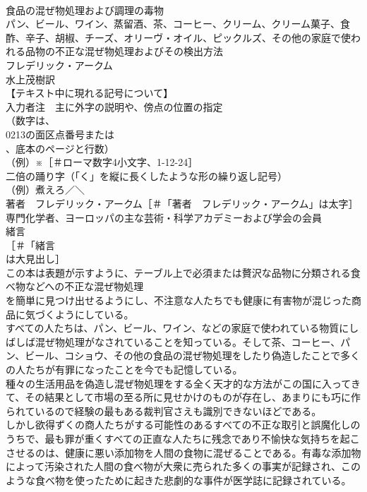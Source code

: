 \documentclass[8pt]{extreport}
\begin{document}
\begin{CJK}{UTF8}{min}
\\	食品の混ぜ物処理および調理の毒物
\\	パン、ビール、ワイン、蒸留酒、茶、コーヒー、クリーム、クリーム菓子、食酢、辛子、胡椒、チーズ、オリーヴ・オイル、ピックルズ、その他の家庭で使われる品物の不正な混ぜ物処理およびその検出方法
\\	フレデリック・アークム　
\\	水上茂樹訳
\\	【テキスト中に現れる記号について】
\\	入力者注　主に外字の説明や、傍点の位置の指定
\\	（数字は、
\\	0213の面区点番号または
\\	、底本のページと行数）
\\	（例）※［＃ローマ数字4小文字、1-12-24］
\\	二倍の踊り字（「く」を縦に長くしたような形の繰り返し記号）
\\	（例）煮えろ／＼
\\	著者　フレデリック・アークム［＃「著者　フレデリック・アークム」は太字］
\\	専門化学者、ヨーロッパの主な芸術・科学アカデミーおよび学会の会員
\\	緒言
\\	［＃「緒言
\\	は大見出し］
\\	この本は表題が示すように、テーブル上で必須または贅沢な品物に分類される食べ物などへの不正な混ぜ物処理
\\	を簡単に見つけ出せるようにし、不注意な人たちでも健康に有害物が混じった商品に気づくようにしている。
\\	すべての人たちは、パン、ビール、ワイン、などの家庭で使われている物質にしばしば混ぜ物処理がなされていることを知っている。そして茶、コーヒー、パン、ビール、コショウ、その他の食品の混ぜ物処理をしたり偽造したことで多くの人たちが有罪になったことを今でも記憶している。
\\	種々の生活用品を偽造し混ぜ物処理をする全く天才的な方法がこの国に入ってきて、その結果として市場の至る所に見せかけのものが存在し、あまりにも巧に作られているので経験の最もある裁判官さえも識別できないほどである。
\\	しかし欲得ずくの商人たちがする可能性のあるすべての不正な取引と誤魔化しのうちで、最も罪が重くすべての正直な人たちに残念であり不愉快な気持ちを起こさせるのは、健康に悪い添加物を人間の食物に混ぜることである。有毒な添加物によって汚染された人間の食べ物が大衆に売られた多くの事実が記録され、このような食べ物を使ったために起きた悲劇的な事件が医学誌に記録されている。

\end{CJK}
\end{document}
